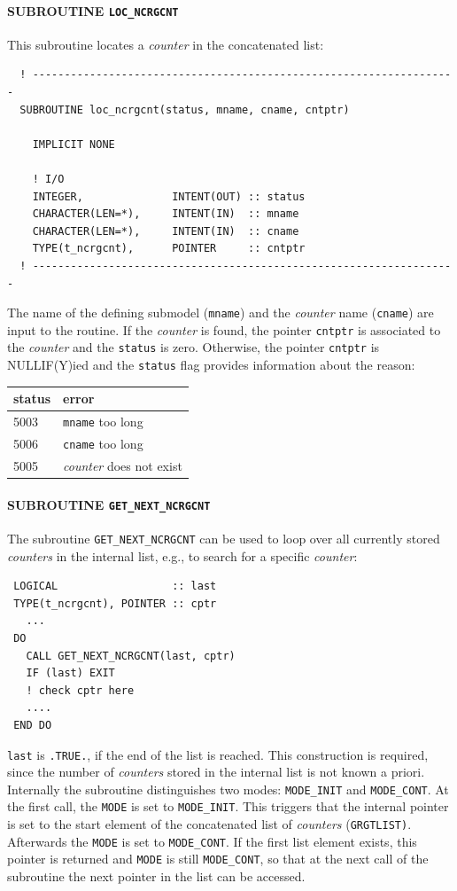 \documentclass[11pt,twoside]{report}
\begin{document}
\paragraph{SUBROUTINE \color{blue} \tt\bf LOC\_NCRGCNT\\ \label{IGCNTLOC}}
This subroutine locates a {\it counter} in the concatenated list:
\begin{verbatim}
  ! -------------------------------------------------------------------
  SUBROUTINE loc_ncrgcnt(status, mname, cname, cntptr)

    IMPLICIT NONE

    ! I/O
    INTEGER,              INTENT(OUT) :: status
    CHARACTER(LEN=*),     INTENT(IN)  :: mname
    CHARACTER(LEN=*),     INTENT(IN)  :: cname
    TYPE(t_ncrgcnt),      POINTER     :: cntptr
  ! -------------------------------------------------------------------
\end{verbatim}
The name of the defining submodel (\verb|mname|) and the {\it counter} name 
 (\verb|cname|) are input to the routine. If the {\it counter} is found, the 
pointer \verb|cntptr| is associated to the {\it counter} and the \verb|status|
is zero. Otherwise, the pointer \verb|cntptr| is NULLIF(Y)ied and the 
 \verb|status| flag provides information about the reason: 

\begin{tabular}{ll}
status  &  error \\ \hline 
5003    &  {\tt mname} too long \\
5006  &  {\tt cname} too long \\
5005 & {\it counter} does not exist\\ \hline
\end{tabular}

\paragraph{SUBROUTINE \color{blue} \tt\bf GET\_NEXT\_NCRGCNT\\ \label{IGCNTNEXT}}
The subroutine \verb|GET_NEXT_NCRGCNT| can be used to loop over all 
currently stored {\it counters} in the internal list, e.g., to search for a 
specific {\it counter}:
\begin{verbatim}
 LOGICAL                  :: last 
 TYPE(t_ncrgcnt), POINTER :: cptr
   ...
 DO
   CALL GET_NEXT_NCRGCNT(last, cptr)
   IF (last) EXIT
   ! check cptr here
   ....
 END DO
\end{verbatim}
\verb|last| is \verb|.TRUE.|, if the end of the list is reached. 
This construction is required, since the number of {\it counters}
stored in the internal list is not known a priori.
Internally the subroutine distinguishes two modes: \verb|MODE_INIT|
and \verb|MODE_CONT|. At the first call, the \verb|MODE| is set
to \verb|MODE_INIT|. This triggers that the internal pointer is set to
the start element of the concatenated list of {\it counters}
(\verb|GRGTLIST)|. Afterwards the \verb|MODE| is set
to \verb|MODE_CONT|. If the first list element exists, this pointer is
returned and \verb|MODE| is still \verb|MODE_CONT|, so that at
the next call of the subroutine the next pointer in the list can be
accessed.
\end{document}
